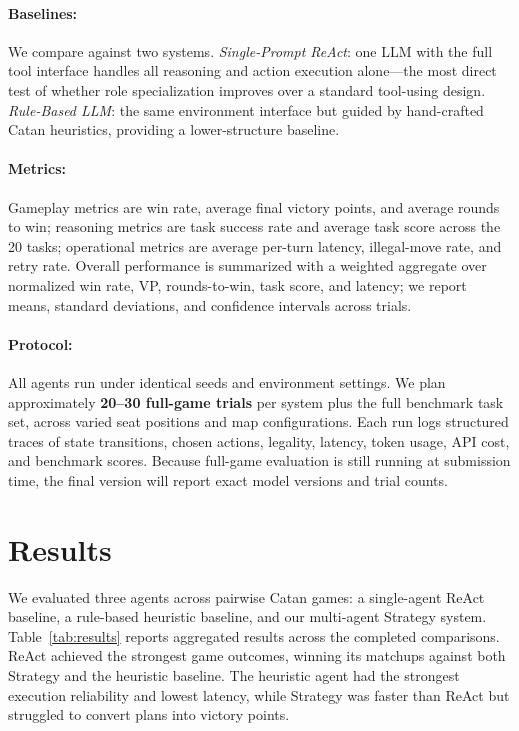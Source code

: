 \documentclass{article} %
\begin{document}
\paragraph{Baselines:} We compare against two systems. \emph{Single-Prompt ReAct}: one LLM with the full tool interface handles all reasoning and action execution alone---the most direct test of whether role specialization improves over a standard tool-using design. \emph{Rule-Based LLM}: the same environment interface but guided by hand-crafted Catan heuristics, providing a lower-structure baseline.

\paragraph{Metrics:} Gameplay metrics are win rate, average final victory points, and average rounds to win; reasoning metrics are task success rate and average task score across the 20 tasks; operational metrics are average per-turn latency, illegal-move rate, and retry rate. Overall performance is summarized with a weighted aggregate over normalized win rate, VP, rounds-to-win, task score, and latency; we report means, standard deviations, and confidence intervals across trials.

\paragraph{Protocol:} All agents run under identical seeds and environment settings. We plan approximately \textbf{20--30 full-game trials} per system plus the full benchmark task set, across varied seat positions and map configurations. Each run logs structured traces of state transitions, chosen actions, legality, latency, token usage, API cost, and benchmark scores. Because full-game evaluation is still running at submission time, the final version will report exact model versions and trial counts.

\section{Results}
\label{sec:results}

We evaluated three agents across pairwise Catan games: a single-agent ReAct baseline, a rule-based heuristic baseline, and our multi-agent Strategy system. Table~\ref{tab:results} reports aggregated results across the completed comparisons. ReAct achieved the strongest game outcomes, winning its matchups against both Strategy and the heuristic baseline. The heuristic agent had the strongest execution reliability and lowest latency, while Strategy was faster than ReAct but struggled to convert plans into victory points.
\end{document}

